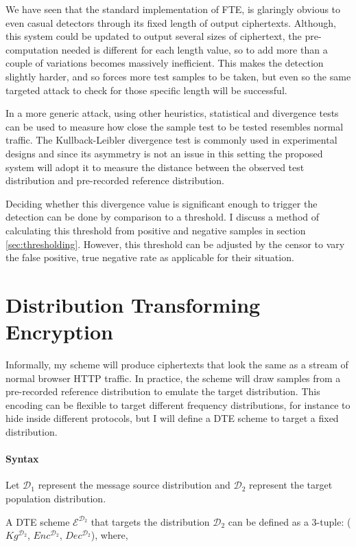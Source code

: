 \documentclass[ %
                    author={Samuel Russell},
                supervisor={Prof. Bogdan Warinschi},
                    degree={MEng},
                     title={Innocuous Ciphertexts},
                  subtitle={The DE-CENSOR Scheme},
                      type={research},
                      year={2018} ]{dissertation}
\begin{document}
We have seen that the standard implementation of FTE, is glaringly obvious to even casual detectors through its fixed length of output ciphertexts.
Although, this system could be updated to output several sizes of ciphertext, the pre-computation needed is different for each length value, so to add more than a couple of variations becomes massively inefficient.
This makes the detection slightly harder, and so forces more test samples to be taken, but even so the same targeted attack to check for those specific length will be successful.

In a more generic attack, using other heuristics, statistical and divergence tests can be used to measure how close the sample test to be tested resembles normal traffic.
The Kullback-Leibler divergence test is commonly used in experimental designs and since its asymmetry is not an issue in this setting the proposed system will adopt it to measure the distance between the observed test distribution and pre-recorded reference distribution.

Deciding whether this divergence value is significant enough to trigger the detection can be done by comparison to a threshold.
I discuss a method of calculating this threshold from positive and negative samples in section \ref{sec:thresholding}. However, this threshold can be adjusted by the censor to vary the false positive, true negative rate as applicable for their situation.


\chapter{Distribution Transforming Encryption}

Informally, my scheme will produce ciphertexts that look the same as a stream of normal browser HTTP traffic.
In practice, the scheme will draw samples from a pre-recorded reference distribution to emulate the target distribution.
This encoding can be flexible to target different frequency distributions, for instance to hide inside different protocols, but I will define a DTE scheme to target a fixed distribution.

\subsubsection{Syntax}
Let $\mathcal{D}_1$ represent the message source distribution and $\mathcal{D}_2$ represent the target population distribution.


A DTE scheme $\mathcal{E}^{\mathcal{D}_2}$ that targets the distribution $\mathcal{D}_2$ can be defined as a 3-tuple: ($Kg^{\mathcal{D}_2}$, $Enc^{\mathcal{D}_2}$, $Dec^{\mathcal{D}_2}$), where,
\end{document}
